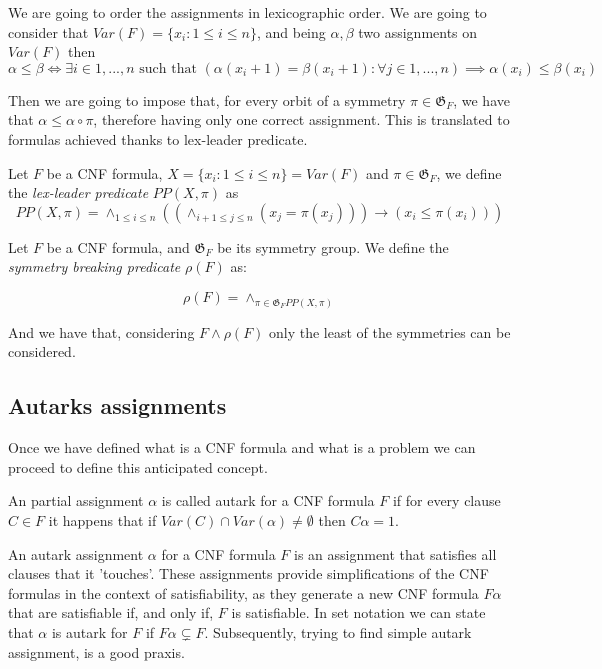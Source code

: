 {We are going to order the assignments in  lexicographic order. We are going to consider that $Var(F) = \{x_i : 1 \le i \le n\}$, and being $\alpha, \beta$ two assignments on $Var(F)$ then
$$\alpha \le \beta \iff \exists i \in 1,...,n \text{ such that }  (\alpha(x_i+1) = \beta(x_i+1):\forall j \in 1,...,n  ) \implies\alpha( x_i) \le\beta (x_i)  $$

Then we are going to impose that, for every orbit of a symmetry $\pi \in \mathfrak{G}_F$, we have that $\alpha\le \alpha\circ\pi$, therefore having only one correct assignment. This is translated to formulas achieved thanks to lex-leader predicate.


\begin{definition}

  Let $F$ be a CNF formula, $X=\{x_i: 1\le i \le n\}=Var(F)$ and $\pi \in \mathfrak{G}_F$, we define the \emph{lex-leader predicate} $PP(X,\pi)$ as
  $$PP(X,\pi) = \land_{1\le i \le n} \left (\left (
    \land_{i+1 \le j \le n} (x_j = \pi(x_j)) \right )  \to (x_i \le \pi(x_i) )\right )$$
\end{definition}


\begin{definition}

  Let $F$ be a CNF formula, and $\mathfrak{G}_F$ be its symmetry group. We define the \emph{symmetry breaking predicate} $\rho(F)$ as:

  $$ \rho(F)  = \land_{\pi \in \mathfrak{G}_F PP(X,\pi)}$$

\end{definition}


And we have that, considering $F\land \rho(F)$ only the least of the symmetries can be considered. 

\subsection{Autarks assignments}
\label{sec:autark}

Once we have defined what is a CNF formula and what is a problem we can proceed to define this anticipated concept.

\begin{definition}
  An partial assignment $\alpha$ is called autark for a CNF formula $F$ if for every clause $C \in F$ it happens that if $Var(C) \cap Var(\alpha) \ne \emptyset $ then $C\alpha = 1$.
\end{definition}

An autark assignment $\alpha$  for a CNF formula $F$ is an assignment that satisfies all clauses that it 'touches'. These assignments provide simplifications of the CNF formulas in the context of satisfiability, as they generate a new CNF formula $F\alpha$ that are satisfiable if, and only if,  $F$ is satisfiable. In set notation we can state that $\alpha$ is autark for $F$ if $F\alpha \subsetneq F$. Subsequently, trying to find simple autark assignment, is a good praxis.\\


}
